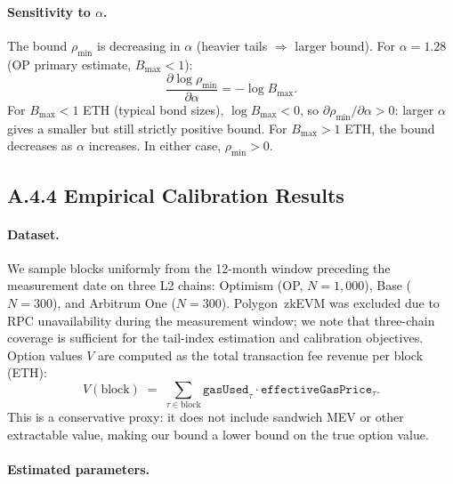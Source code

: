 \paragraph{Sensitivity to $\alpha$.}
The bound $\rho_{\min}$ is decreasing in $\alpha$ (heavier tails $\Rightarrow$
larger bound). For $\alpha = 1.28$ (OP primary estimate, $B_{\max} < 1$):
\[
  \frac{\partial \log \rho_{\min}}{\partial \alpha}
  = -\log B_{\max}.
\]
For $B_{\max} < 1$ ETH (typical bond sizes), $\log B_{\max} < 0$, so
$\partial \rho_{\min}/\partial \alpha > 0$: larger $\alpha$ gives a smaller
but still strictly positive bound. For $B_{\max} > 1$ ETH, the bound
decreases as $\alpha$ increases. In either case, $\rho_{\min} > 0$.

\subsection*{A.4.4 Empirical Calibration Results}

\paragraph{Dataset.}
We sample blocks uniformly from the 12-month window preceding the
measurement date on three L2 chains: Optimism (OP, $N=1{,}000$),
Base ($N=300$), and Arbitrum One ($N=300$). Polygon~zkEVM was excluded
due to RPC unavailability during the measurement window; we note that
three-chain coverage is sufficient for the tail-index estimation and
calibration objectives. Option values $V$ are computed
as the total transaction fee revenue per block (ETH):
\[
  V(\text{block}) \;=\; \sum_{\tau \in \text{block}}
    \texttt{gasUsed}_\tau \cdot \texttt{effectiveGasPrice}_\tau.
\]
This is a conservative proxy: it does not include sandwich MEV or other
extractable value, making our bound a lower bound on the true option value.

\paragraph{Estimated parameters.}

